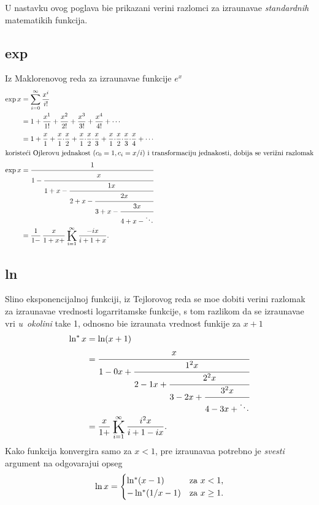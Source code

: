 \documentclass[12pt, twoside, a4paper]{article}
\def\vr#1{\ifcase#1\relax\or
  ve\-ri{\zv}\-ni raz\-lo\-mak\or
  ve\-ri{\zv}\-nog raz\-lom\-ka\or
  ve\-ri{\zv}\-nom raz\-lom\-ku\or
  ve\-ri{\zv}\-ni raz\-lo\-mak\or
  ve\-ri{\zv}\-ni raz\-lom\-{\cv}e\or
  ve\-ri{\zv}\-nim raz\-lom\-kom\or
  ve\-ri{\zv}\-nom raz\-lom\-ku\fi}
\begin{document}
U nastavku ovog poglav{\lj}a bi{\cc}e prikazani veri{\zv}ni razlomci za izra{\cv}unava{\nj}e
{\sl stan\-dard\-nih\/} matemati{\cv}kih funkcija.

\subsection{exp}

\def\d{{\cdot}}
Iz Maklorenovog reda za izra{\cv}unava{\nj}e funkcije $e^x$
\begin{align*}
\exp x  &= \sum_{i=0}^\infty{x^i\over i!}\\
&= 1 + {x^1\over1!} + {x^2\over2!} + {x^3\over3!} + {x^4\over4!} + \cdots\\
\noalign{\smallskip}
&= 1 + {x\over1}+{x\over1}\d{x\over2}+{x\over1}\d{x\over2}\d{x\over3}+{x\over1}\d{x\over2}\d{x\over3}\d{x\over4}+\cdots\\
\intertext{koriste{\cc}i Ojlerovu jednakost ($c_0=1, c_i=x/i$)
i transformaciju jednakosti, dobija se \vr1}
\exp x &= \cfrac{1}{1-\cfrac{x}{1+x-\cfrac{1x}{2+x-\cfrac{2x}{3+x-\cfrac{3x}{4+x-\ddots}}}}}\\
&= \frac{1}{1-}\, \frac{x}{1+x+}  \Kinf{-ix}{i+1+x}.
\end{align*}

\subsection{ln}

Sli{\cv}no eksponencijalnoj funkciji, iz Tejlorovog reda se mo{\zv}e dobiti veri{\zv}ni razlomak
za izra{\cv}unava{\nj}e vrednosti logarritamske funkcije, s tom razlikom da se izra{\cv}unava{\nj}e vr{\sv}i {\sl u~okolini\/} ta{\cv}ke 1,
odnosno bi{\cc}e izra{\cv}unata vrednost funkije za $x+1$
\def\lnp{\mathop{\rm ln^*}}
\begin{align*}
\lnp x&=\ln(x+1)\\
&=\cfrac{x}{1-0x+\cfrac{1^2x}{2-1x+\cfrac{2^2x}{3-2x+\cfrac{3^2x}{4-3x+\ddots}}}}\\
&=\frac{x}{1+} \Kinf{i^2x}{i+1-ix}.
\end{align*}
Kako funkcija konvergira samo za $x<1$, pre izra{\cv}unava{\nj}a potrebno je {\sl svesti\/} argument
na odgovaraju{\cc}i opseg
$$
\ln x=
\begin{cases}
\lnp(x-1)&\text{za $x<1$},\\
-\lnp(1/x-1)&\text{za $x\ge1$}.
\end{cases}
$$
\end{document}
